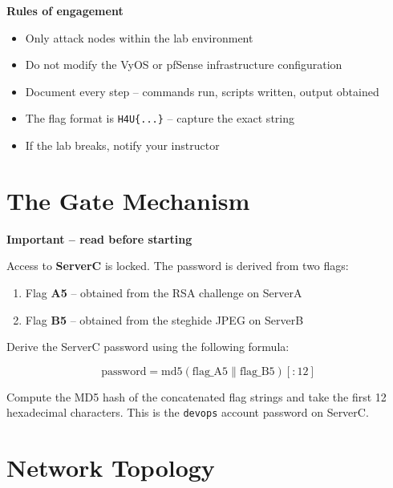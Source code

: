\documentclass[a4paper, 12pt]{article}
\begin{document}
\begin{mdframed}[backgroundcolor=labgray, linecolor=labpurple, linewidth=1pt]
\textbf{Rules of engagement}
\begin{itemize}[leftmargin=1.5em, topsep=2pt]
  \item Only attack nodes within the lab environment
  \item Do not modify the VyOS or pfSense infrastructure configuration
  \item Document every step -- commands run, scripts written, output obtained
  \item The flag format is \texttt{H4U\{...\}} -- capture the exact string
  \item If the lab breaks, notify your instructor
\end{itemize}
\end{mdframed}

\section{The Gate Mechanism}

\begin{mdframed}[backgroundcolor=labgray, linecolor=labred, linewidth=1pt]
\textbf{Important -- read before starting}

Access to \textbf{ServerC} is locked. The password is derived from two flags:

\begin{enumerate}[leftmargin=2em]
  \item Flag \textbf{A5} -- obtained from the RSA challenge on ServerA
  \item Flag \textbf{B5} -- obtained from the steghide JPEG on ServerB
\end{enumerate}

Derive the ServerC password using the following formula:

\[
\text{password} = \text{md5}(\text{flag\_A5} \| \text{flag\_B5})[{:}12]
\]

Compute the MD5 hash of the concatenated flag strings and take the first 12
hexadecimal characters. This is the \texttt{devops} account password on ServerC.
\end{mdframed}

\section{Network Topology}
\end{document}
